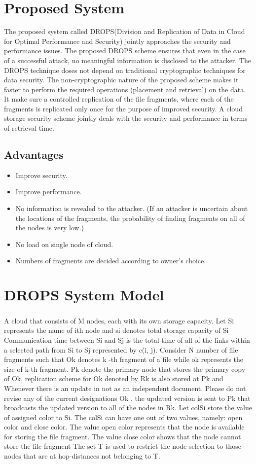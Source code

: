 \chapter{Proposed System}
The proposed system called DROPS(Division and Replication of Data in Cloud for Optimal Performance and Security) jointly approaches the security and performance issues. The proposed DROPS scheme ensures that even in the case of a successful attack, no meaningful information is disclosed to the attacker. The DROPS technique doses not depend on traditional cryptographic techniques for data security. The non-cryptographic nature of the proposed scheme makes it faster to perform the required operations (placement and retrieval) on the data. It make sure a controlled replication of the file fragments,
where each of the fragments is replicated only once for the purpose of improved security.
A cloud storage security scheme jointly deals with the security and performance in terms
of retrieval time.
\section{Advantages}
\begin{itemize}
	\item  Improve security.
	\item  Improve performance. 
	\item  No information is revealed to the attacker. (If an attacker is uncertain about the locations of the fragments, the probability of finding fragments on all of the nodes is very low.)
	\item  No load on single node of cloud.
	\item  Numbers of fragments are decided according to owner’s choice.
\end{itemize}
\chapter{ DROPS System Model}
\paragraph{}
A cloud that consists of M nodes, each with its own storage capacity. Let Si represents
the name of ith node and si denotes total storage capacity of Si Communication time
between Si and Sj is the total time of all of the links within a selected path from Si to Sj
represented by c(i, j). Consider N number of file fragments such that Ok denotes k -th
fragment of a file while ok represents the size of k-th fragment. Pk denote the primary
node that stores the primary copy of Ok, replication scheme for Ok denoted by Rk is also
stored at Pk and Whenever there is an update in not as an independent document. Please
do not revise any of the current designations Ok , the updated version is sent to Pk that
broadcasts the updated version to all of the nodes in Rk. Let colSi store the value of
assigned color to Si. The colSi can have one out of two values, namely: open color and
close color. The value open color represents that the node is available for storing the file
fragment. The value close color shows that the node cannot store the file fragment The
set T is used to restrict the node selection to those nodes that are at hop-distances not
belonging to T.
